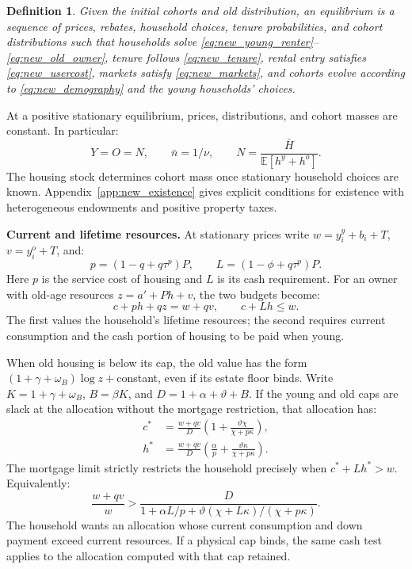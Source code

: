 \documentclass[11pt]{article}
\newtheorem{definition}{Definition}
\begin{document}
\begin{definition}
Given the initial cohorts and old distribution, an equilibrium is a sequence
of prices, rebates, household choices, tenure probabilities, and cohort
distributions such that households solve
\eqref{eq:new_young_renter}--\eqref{eq:new_old_owner}, tenure follows
\eqref{eq:new_tenure}, rental entry satisfies \eqref{eq:new_usercost}, markets
satisfy \eqref{eq:new_markets}, and cohorts evolve according to
\eqref{eq:new_demography} and the young households' choices.
\end{definition}

At a positive stationary equilibrium, prices, distributions, and cohort
masses are constant. In particular:
\begin{equation}
Y=O=N,\qquad \bar n=1/\nu,\qquad
N=\frac{\bar H}{\mathbb E[h^y+h^o]}.
\label{eq:new_stationary}
\end{equation}
The housing stock determines cohort mass once stationary household choices
are known. Appendix~\ref{app:new_existence} gives explicit conditions for
existence with heterogeneous endowments and positive property taxes.

\textbf{Current and lifetime resources.} At stationary prices write
$w=y_i^y+b_i+T$, $v=y_i^o+T$, and:
\begin{equation}
p=(1-q+q\tau^p)P,\qquad L=(1-\phi+q\tau^p)P.
\end{equation}
Here $p$ is the service cost of housing and $L$ is its cash requirement.
For an owner with old-age resources $z=a'+Ph+v$, the two budgets become:
\begin{equation}
c+ph+qz=w+qv,\qquad c+Lh\le w.
\label{eq:new_two_budgets}
\end{equation}
The first values the household's lifetime resources; the second requires
current consumption and the cash portion of housing to be paid when young.

When old housing is below its cap, the old value has the form
$(1+\gamma+\omega_B)\log z+$constant, even if its estate floor binds.
Write $K=1+\gamma+\omega_B$, $B=\beta K$, and
$D=1+\alpha+\vartheta+B$. If the young and old caps are slack at the
allocation without the mortgage restriction, that allocation has:
\begin{equation}
\begin{aligned}
c^*&=\frac{w+qv}{D}
       \left(1+\frac{\vartheta\chi}{\chi+p\kappa}\right),\\
h^*&=\frac{w+qv}{D}
       \left(\frac\alpha p+\frac{\vartheta\kappa}{\chi+p\kappa}\right).
\end{aligned}
\label{eq:new_free_choices}
\end{equation}
The mortgage limit strictly restricts the household precisely when
$c^*+Lh^*>w$. Equivalently:
\begin{equation}
\boxed{\quad
\frac{w+qv}{w}>
\frac D{1+\alpha L/p+
\vartheta(\chi+L\kappa)/(\chi+p\kappa)}.
\quad}
\label{eq:new_binding}
\end{equation}
The household wants an allocation whose current consumption and down payment
exceed current resources. If a physical cap binds, the same cash test applies
to the allocation computed with that cap retained.
\end{document}
